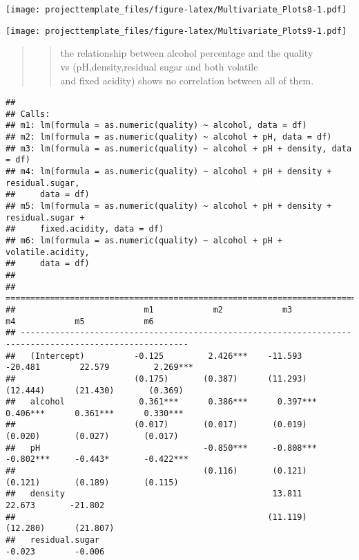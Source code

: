 \documentclass[]{article}
\begin{document}
\texttt{[image: projecttemplate\_files/figure-latex/Multivariate\_Plots8-1.pdf]}

\texttt{[image: projecttemplate\_files/figure-latex/Multivariate\_Plots9-1.pdf]}

\begin{quote}
\begin{quote}
the relationship between alcohol percentage and the quality\\
vs (pH,density,residual sugar and both volatile\\
and fixed acidity) shows no correlation between all of them.\\
\end{quote}
\end{quote}

\begin{verbatim}
## 
## Calls:
## m1: lm(formula = as.numeric(quality) ~ alcohol, data = df)
## m2: lm(formula = as.numeric(quality) ~ alcohol + pH, data = df)
## m3: lm(formula = as.numeric(quality) ~ alcohol + pH + density, data = df)
## m4: lm(formula = as.numeric(quality) ~ alcohol + pH + density + residual.sugar, 
##     data = df)
## m5: lm(formula = as.numeric(quality) ~ alcohol + pH + density + residual.sugar + 
##     fixed.acidity, data = df)
## m6: lm(formula = as.numeric(quality) ~ alcohol + pH + volatile.acidity, 
##     data = df)
## 
## ========================================================================================================
##                          m1            m2            m3            m4            m5            m6       
## --------------------------------------------------------------------------------------------------------
##   (Intercept)          -0.125         2.426***    -11.593       -20.481        22.579         2.269***  
##                        (0.175)       (0.387)      (11.293)      (12.444)      (21.430)       (0.369)    
##   alcohol               0.361***      0.386***      0.397***      0.406***      0.361***      0.330***  
##                        (0.017)       (0.017)       (0.019)       (0.020)       (0.027)       (0.017)    
##   pH                                 -0.850***     -0.808***     -0.802***     -0.443*       -0.422***  
##                                      (0.116)       (0.121)       (0.121)       (0.189)       (0.115)    
##   density                                          13.811        22.673       -21.802                   
##                                                   (11.119)      (12.280)      (21.807)                  
##   residual.sugar                                                 -0.023        -0.006                   

\end{verbatim}
\end{document}
